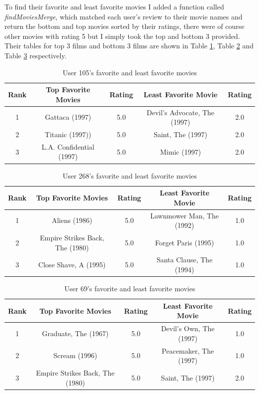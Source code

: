 \documentclass[letterpaper,11pt]{article}
\begin{document}
To find their favorite and least favorite movies I added a function called \textit{findMoviesMerge}, which matched each user's review to their movie names and return the bottom and top movies sorted by their ratings, there were of course other movies with rating 5 but I simply took the top and bottom 3 provided. Their tables for top 3 films and bottom 3 films are shown in Table \ref{table:q1user1}, Table \ref{table:q1user2} and Table \ref{table:q1user3} respectively.



\begin{table}[htb]
\begin{tabular}{ | c | c | c | | c | c |}
\hline
\textbf{Rank} & \textbf{Top Favorite Movies} & \textbf{Rating} & \textbf{Least Favorite Movie} & \textbf{Rating} \\
\hline
1 &Gattaca (1997) & 5.0 & Devil's Advocate, The (1997) & 2.0 \\
\hline
2 &Titanic (1997)) & 5.0 & Saint, The (1997) & 2.0 \\
\hline
3 & L.A. Confidential (1997)& 5.0 & Mimic (1997) & 2.0 \\
\hline
\end{tabular}
\caption{User 105's favorite and least favorite movies}
\label{table:q1user1}
\end{table}

\begin{table}[htb]
\begin{tabular}{ | c | c | c | | c | c |}
\hline
\textbf{Rank} & \textbf{Top Favorite Movies} & \textbf{Rating} & \textbf{Least Favorite Movie} & \textbf{Rating} \\
\hline
1 & Aliens (1986) & 5.0 & Lawnmower Man, The (1992) & 1.0 \\
\hline
2 & Empire Strikes Back, The (1980) & 5.0 &Forget Paris (1995) & 1.0 \\
\hline
3 & Close Shave, A (1995) & 5.0 & Santa Clause, The (1994) & 1.0 \\
\hline
\end{tabular}
\caption{User 268's favorite and least favorite movies}
\label{table:q1user2}
\end{table}

\clearpage

\begin{table}[htb]
\begin{tabular}{ | c | c | c | | c | c |}
\hline
\textbf{Rank} & \textbf{Top Favorite Movies} & \textbf{Rating} & \textbf{Least Favorite Movie} & \textbf{Rating} \\
\hline
1 & Graduate, The (1967) & 5.0 &Devil's Own, The (1997) & 1.0 \\
\hline
2 & Scream (1996) & 5.0 &Peacemaker, The (1997) & 1.0 \\
\hline
3 & Empire Strikes Back, The (1980) & 5.0 &Saint, The (1997) & 2.0 \\
\hline
\end{tabular}
\caption{User 69's favorite and least favorite movies}
\label{table:q1user3}
\end{table}
\end{document}
